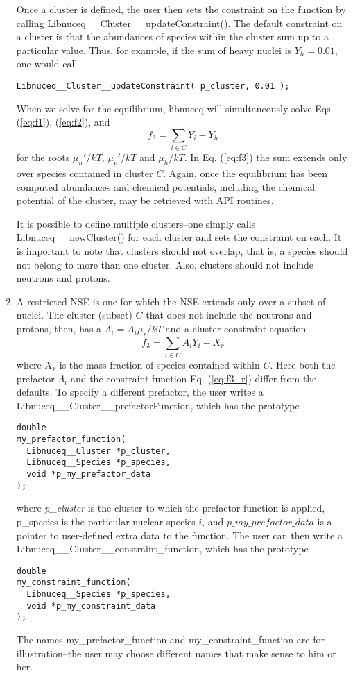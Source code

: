 \documentclass{article}    %
\begin{document}
\begin{enumerate}
Once a cluster is defined, the user then sets the constraint on the
function by calling Libnuceq\_\_Cluster\_\_updateConstraint().  The
default constraint on a cluster is that the abundances of species
within the cluster sum up to a particular value.  Thus, for example,
if the sum of heavy nuclei is $Y_h = 0.01$, one would call
\begin{verbatim}
Libnuceq__Cluster__updateConstraint( p_cluster, 0.01 );
\end{verbatim}
When we solve for the equilibrium, libnuceq will simultaneously solve
Eqs. (\ref{eq:f1}), (\ref{eq:f2}), and
\begin{equation}
f_3 = \sum_{i\in C} Y_i - Y_h
\label{eq:f3}
\end{equation}
for the roots $\mu_n'/kT$, $\mu_p'/kT$ and $\mu_h/kT$.  In Eq. (\ref{eq:f3})
the sum extends only over species contained in cluster $C$. Again, once the
equilibrium has been computed abundances and chemical potentials, including
the chemical potential of the cluster, may be retrieved with API routines.

It is possible to define multiple clusters--one simply calls
Libnuceq\_\_newCluster() for each cluster and sets the constraint on each.
It is important to note that clusters should not overlap, that is, a
species should not belong to more than one cluster.  Also, clusters should
not include neutrons and protons.

\item\label{sec:rnse}
A restricted NSE is one for which the NSE extends only over a subset of nuclei.
The cluster (subset) $C$
that does not include the neutrons and protons, then, has
a $\Lambda_i = A_i \mu_r / kT$ and a cluster constraint equation
\begin{equation}
f_3 = \sum_{i\in C} A_i Y_i - X_r
\label{eq:f3_r}
\end{equation}
where $X_r$ is the mass fraction of species contained within $C$.
Here both the prefactor $\Lambda_i$ and the constraint function
Eq. (\ref{eq:f3_r}) differ from the defaults.  To specify a different
prefactor, the user writes a Libnuceq\_\_Cluster\_\_prefactorFunction,
which has the prototype
\begin{verbatim}
double
my_prefactor_function(
  Libnuceq__Cluster *p_cluster,
  Libnuceq__Species *p_species,
  void *p_my_prefactor_data
);
\end{verbatim}
where {\em p\_cluster} is the cluster to which the prefactor function is
applied, {p\_species} is the particular nuclear species $i$, and
$p\_my\_prefactor\_data$
is a pointer to user-defined extra data to the function.  The user can
then write a Libnuceq\_\_Cluster\_\_constraint\_function,
which has the prototype
\begin{verbatim}
double
my_constraint_function(
  Libnuceq__Species *p_species,
  void *p_my_constraint_data
);
\end{verbatim}
The names my\_prefactor\_function and my\_constraint\_function
are for illustration--the user may choose different names that make
sense to him or her.


\end{enumerate}
\end{document}
